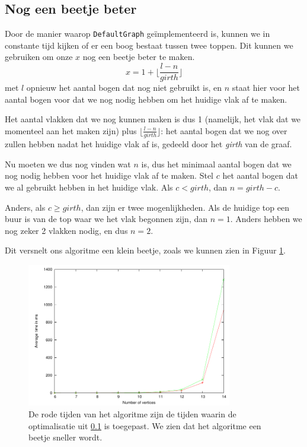 \documentclass{article}
\begin{document}
\subsection{Nog een beetje beter}
\label{beetje-beter}
Door de manier waarop \verb#DefaultGraph# ge\"implementeerd is, kunnen we
in constante tijd kijken of er een boog bestaat tussen twee toppen. Dit kunnen
we gebruiken om onze $x$ nog een beetje beter te maken.
\begin{equation*}
x = 1 + \lfloor\frac{l - n}{girth}\rfloor
\end{equation*}
met $l$ opnieuw het aantal bogen dat nog niet gebruikt is, en $n$ staat hier
voor het aantal bogen voor dat we nog nodig hebben om het huidige vlak af te
maken.
\newline

Het aantal vlakken dat we nog kunnen maken is dus 1 (namelijk, het vlak dat we
momenteel aan het maken zijn) plus $\lfloor\frac{l - n}{girth}\rfloor$:
het aantal bogen dat we nog over zullen hebben nadat het huidige vlak af is,
gedeeld door het \emph{girth} van de graaf.
\newline

Nu moeten we dus nog vinden wat $n$ is, dus het minimaal aantal bogen dat we
nog nodig hebben voor het huidige vlak af te maken. Stel $c$ het aantal bogen
dat we al gebruikt hebben in het huidige vlak. Als $c < girth$, dan
$n = girth - c$.
\newline

Anders, als $c \geq girth$, dan zijn er twee mogenlijkheden. Als de huidige top
een buur is van de top waar we het vlak begonnen zijn, dan $n = 1$. Anders
hebben we nog zeker 2 vlakken nodig, en dus $n = 2$.
\newline

Dit versnelt ons algoritme een klein beetje, zoals we kunnen zien in Figuur
\ref{fig:bounded-vs-beetje-beter}.

\begin{figure}
\begin{center}
\includegraphics[width=0.8\textwidth]{images/bounded-vs-beetje-beter.pdf}
\caption{De rode tijden van het algoritme zijn de tijden waarin de optimalisatie
uit \ref{beetje-beter} is toegepast. We zien dat het algoritme een beetje
sneller wordt.}
\label{fig:bounded-vs-beetje-beter}
\end{center}
\end{figure}
\end{document}
